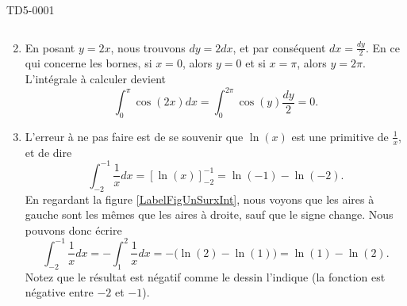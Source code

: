 \begin{corrige}{TD5-0001}
\begin{enumerate}
\begin{equation}
			\end{equation}
		\item
			En posant $y=2x$, nous trouvons $dy=2dx$, et par conséquent $dx=\frac{ dy }{2}$. En ce qui concerne les bornes, si $x=0$, alors $y=0$ et si $x=\pi$, alors $y=2\pi$. L'intégrale à calculer devient
			\begin{equation}
				\int_0^{\pi}\cos(2x)dx=\int_0^{2\pi}\cos(y)\frac{ dy }{ 2 }=0.
			\end{equation}
		\item
			L'erreur à ne pas faire est de se souvenir que $\ln(x)$ est une primitive de $\frac{1}{ x }$, et de dire
			\begin{equation}
				\int_{-2}^{-1}\frac{1}{ x }dx=\left[ \ln(x) \right]_{-2}^{-1}=\ln(-1)-\ln(-2).
			\end{equation}
			En regardant la figure \ref{LabelFigUnSurxInt}, nous voyons que les aires à gauche sont les mêmes que les aires à droite, sauf que le signe change. Nous pouvons donc écrire
			\begin{equation}
				\int_{-2}^{-1}\frac{1}{ x }dx=-\int_1^2\frac{1}{ x }dx=-\Big( \ln(2)-\ln(1) \Big)=\ln(1)-\ln(2).
			\end{equation}
			Notez que le résultat est négatif comme le dessin l'indique (la fonction est négative entre $-2$ et $-1$).


\end{enumerate}
\end{corrige}
